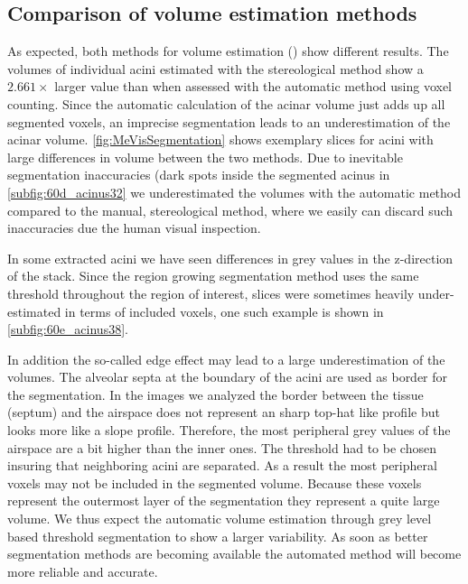 \documentclass[final,paper=a4,DIV=calc,abstract,english]{scrartcl}
\newcommand{\difference}{2.661\xspace} %
\begin{document}
\subsection{Comparison of volume estimation methods}
As expected, both methods for volume estimation () show different results.
The volumes of individual acini estimated with the stereological method show a \(\difference\times\) larger value than when assessed with the automatic method using voxel counting.
Since the automatic calculation of the acinar volume  just adds up all segmented voxels, an imprecise segmentation leads to an underestimation of the acinar volume.
\autoref{fig:MeVisSegmentation} shows exemplary slices for acini with large differences in volume between the two methods.
Due to inevitable segmentation inaccuracies (dark spots inside the segmented acinus in \autoref{subfig:60d_acinus32} we underestimated the volumes with the automatic method compared to the manual, stereological method, where we easily can discard such inaccuracies due the human visual inspection.

In some extracted acini we have seen differences in grey values in the z-direction of the stack.
Since the region growing segmentation method uses the same threshold throughout the region of interest, slices were sometimes heavily under-estimated in terms of included voxels, one such example is shown in \autoref{subfig:60e_acinus38}.

In addition the so-called edge effect may lead to a large underestimation of the volumes.
The alveolar septa at the boundary of the acini are used as border for the segmentation.
In the images we analyzed the border between the tissue (septum) and the airspace does not represent an sharp top-hat like profile but looks more like a slope profile.
Therefore, the most peripheral grey values of the airspace are a bit higher than the inner ones.
The threshold had to be chosen insuring that neighboring acini are separated.
As a result the most peripheral voxels may not be included in the segmented volume.
Because these voxels represent the outermost layer of the segmentation they represent a quite large volume.
We thus expect the automatic volume estimation through grey level based threshold segmentation to show a larger variability.
As soon as better segmentation methods are becoming available the automated method will become more reliable and accurate.
\end{document}
